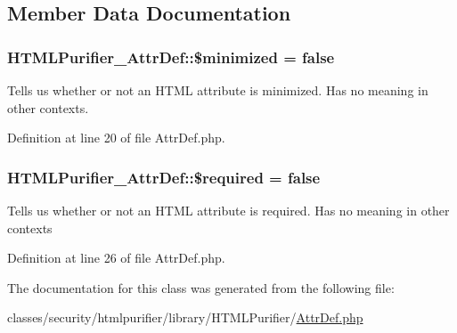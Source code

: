 \subsection{Member Data Documentation}
\hypertarget{classHTMLPurifier__AttrDef_a970c87d71a9c82781741194fd67a62df}{
\subsubsection[{\$minimized}]{\setlength{\rightskip}{0pt plus 5cm}H\+T\+M\+L\+Purifier\+\_\+\+Attr\+Def\+::\$minimized = false}}\label{classHTMLPurifier__AttrDef_a970c87d71a9c82781741194fd67a62df}
Tells us whether or not an H\+T\+M\+L attribute is minimized. Has no meaning in other contexts. 

Definition at line 20 of file Attr\+Def.\+php.

\hypertarget{classHTMLPurifier__AttrDef_a900a27ff615bbe5e080f04e46d584367}{
\subsubsection[{\$required}]{\setlength{\rightskip}{0pt plus 5cm}H\+T\+M\+L\+Purifier\+\_\+\+Attr\+Def\+::\$required = false}}\label{classHTMLPurifier__AttrDef_a900a27ff615bbe5e080f04e46d584367}
Tells us whether or not an H\+T\+M\+L attribute is required. Has no meaning in other contexts 

Definition at line 26 of file Attr\+Def.\+php.



The documentation for this class was generated from the following file\+:\begin{DoxyCompactItemize}
\item 
classes/security/htmlpurifier/library/\+H\+T\+M\+L\+Purifier/\hyperlink{AttrDef_8php}{Attr\+Def.\+php}\end{DoxyCompactItemize}
